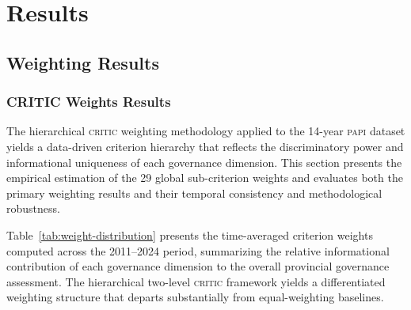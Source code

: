 \documentclass[12pt,a4paper]{article}
\newcommand{\PAPI}{\textsc{papi}\xspace}
\newcommand{\CRITIC}{\textsc{critic}\xspace}
\begin{document}
\section{Results}
\label{sec:results}

\subsection{Weighting Results}
\label{subsec:results_weights}

\subsubsection{CRITIC Weights Results}

The hierarchical \CRITIC weighting methodology applied to the 14-year \PAPI dataset yields a data-driven criterion hierarchy that reflects the discriminatory power and informational uniqueness of each governance dimension. This section presents the empirical estimation of the 29 global sub-criterion weights and evaluates both the primary weighting results and their temporal consistency and methodological robustness.

Table~\ref{tab:weight-distribution} presents the time-averaged criterion weights computed across the 2011--2024 period, summarizing the relative informational contribution of each governance dimension to the overall provincial governance assessment. The hierarchical two-level \CRITIC framework yields a differentiated weighting structure that departs substantially from equal-weighting baselines.
\end{document}
